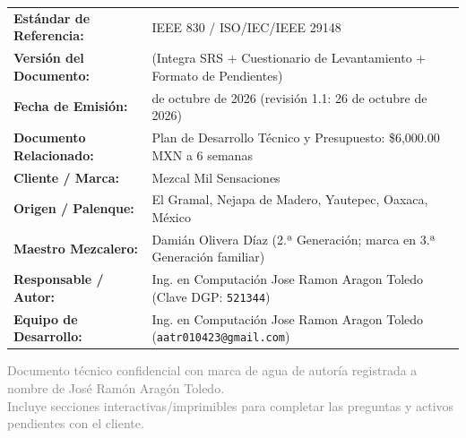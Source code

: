 \documentclass[11pt,letterpaper]{article}
\begin{document}
\begin{titlepage}
    \begin{tcolorbox}[colback=mezcalCream, colframe=mezcalEarth, title=\textbf{Ficha de Control del Documento}, fonttitle=\bfseries\large]
        \renewcommand{\arraystretch}{1.35}
        \begin{tabularx}{\linewidth}{@{} l >{\raggedright\arraybackslash}X @{}}
            \textbf{Estándar de Referencia:} & IEEE 830 / ISO/IEC/IEEE 29148 \\
            \textbf{Versión del Documento:} & 1.1 (Integra SRS + Cuestionario de Levantamiento + Formato de Pendientes) \\
            \textbf{Fecha de Emisión:} & 23 de octubre de 2026 (revisión 1.1: 26 de octubre de 2026) \\
            \textbf{Documento Relacionado:} & Plan de Desarrollo Técnico y Presupuesto: \$6,000.00 MXN a 6 semanas \\
            \textbf{Cliente / Marca:} & Mezcal Mil Sensaciones \\
            \textbf{Origen / Palenque:} & El Gramal, Nejapa de Madero, Yautepec, Oaxaca, México \\
            \textbf{Maestro Mezcalero:} & Damián Olivera Díaz (2.ª Generación; marca en 3.ª Generación familiar) \\
            \textbf{Responsable / Autor:} & Ing. en Computación Jose Ramon Aragon Toledo (Clave DGP: \texttt{521344}) \\
            \textbf{Equipo de Desarrollo:} & Ing. en Computación Jose Ramon Aragon Toledo (\texttt{aatr010423@gmail.com}) \\
        \end{tabularx}
    \end{tcolorbox}

    \vfill

    \begin{center}
        \footnotesize\textcolor{gray}{Documento técnico confidencial con marca de agua de autoría registrada a nombre de José Ramón Aragón Toledo.\\ Incluye secciones interactivas/imprimibles para completar las preguntas y activos pendientes con el cliente.}
    \end{center}
\end{titlepage}

\tableofcontents
\newpage

\end{document}
